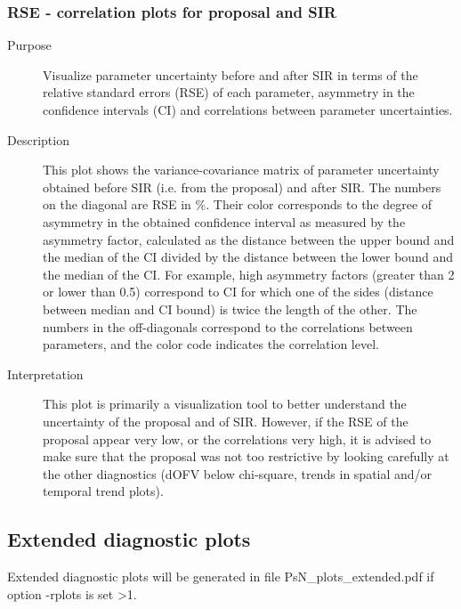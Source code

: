 \subsubsection{RSE - correlation plots for proposal and SIR}
\begin{description}
\item[Purpose] Visualize parameter uncertainty before and after SIR in terms of
the relative standard errors (RSE) of each parameter, asymmetry in the confidence intervals (CI) and correlations
between parameter uncertainties.
\item[Description] This plot shows the variance-covariance matrix of parameter uncertainty obtained before SIR (i.e. from the proposal)
and after SIR. The numbers on the diagonal are RSE in \%. Their color corresponds to the degree of asymmetry in the obtained confidence
interval as measured by the asymmetry factor, calculated as the distance between the upper bound and the median of the CI divided by the
distance between the lower bound and the median of the CI. For example, high asymmetry factors (greater than 2 or lower than 0.5)
correspond to CI for which one of the sides (distance between median and CI bound) is twice the length of the other. The numbers
in the off-diagonals correspond to the correlations between parameters, and the color code indicates the correlation level.
\item[Interpretation] This plot is primarily a visualization tool to better understand the uncertainty of
the proposal and of SIR. However, if the RSE of the proposal appear very low, or the correlations very high, it is advised to make sure
that the proposal was not too restrictive by looking carefully at the other diagnostics (dOFV below chi-square, trends in spatial and/or
temporal trend plots).
\end{description}


\subsection{Extended diagnostic plots}
Extended diagnostic plots will be generated
in file PsN\_plots\_extended.pdf if option -rplots is set >1.

